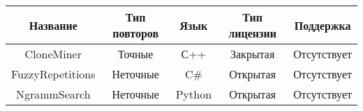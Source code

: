\begin{minipage}{0.9\textwidth}
\begin{adjustbox}{center}
\begin{tabular}{|c|c|c|c|c|}
	\hline
	Название & Тип повторов & Язык & Тип лицензии & Поддержка \\
	\hline
	\hline
	CloneMiner & Точные & С++ & Закрытая & Отсутствует \\
	\hline
	FuzzyRepetitions & Неточные & C\# & Открытая & Отсутствует \\
	\hline
	NgrammSearch & Неточные & Python & Открытая & Отсутствует \\
	\hline
\end{tabular}
\end{adjustbox}
\end{minipage}
